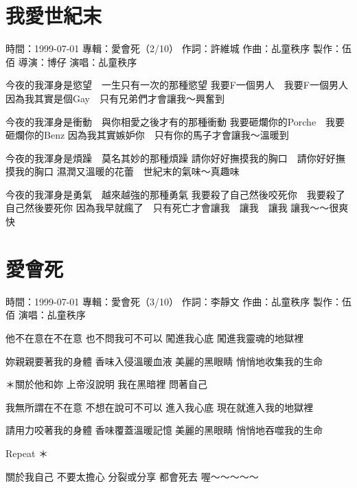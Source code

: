 \documentclass[UTF8,a4paper,oneside,twocolumn,12pt]{ctexbook}
\newcommand{\infopair}[2]{\textbullet #1：#2}
\newcommand{\zc}[1][伍佰]{\infopair{作詞}{#1}}
\newcommand{\zq}[1][伍佰]{\infopair{作曲}{#1}}
\newcommand{\zj}[1]{\infopair{專輯}{#1}}
\newcommand{\zz}[1]{\infopair{製作}{#1}}
\newcommand{\sj}[1]{\infopair{時間}{#1}}
\newenvironment{info}{\begin{flushleft}\kaishu
	}
	{\end{flushleft}\normalsize\yahei\par}
\newenvironment{lyric}{
	}
{}
\begin{document}
\section{我愛世紀末}
\begin{info}
	\sj{1999-07-01}
	\zj{愛會死（2/10）}
	\zc[許維城]
	\zq[乩童秩序]
	\zz{伍佰}
	\infopair{導演}{博仔}
	\infopair{演唱}{乩童秩序}
\end{info}
\begin{lyric}
	今夜的我渾身是慾望　一生只有一次的那種慾望
	我要F一個男人　我要F一個男人
	因為我其實是個Gay　只有兄弟們才會讓我～興奮到

	今夜的我渾身是衝動　與你相愛之後才有的那種衝動
	我要砸爛你的Porche　我要砸爛你的Benz
	因為我其實嫉妒你　只有你的馬子才會讓我～溫暖到

	今夜的我渾身是煩躁　莫名其妙的那種煩躁
	請你好好撫摸我的胸口　請你好好撫摸我的胸口
	濕潤又溫暖的花蕾　世紀末的氣味～真趣味

	今夜的我渾身是勇氣　越來越強的那種勇氣
	我要殺了自己然後咬死你　我要殺了自己然後要死你
	因為我早就瘋了　只有死亡才會讓我　讓我　讓我
	讓我～～很爽快
\end{lyric}

\section{愛會死}
\begin{info}
	\sj{1999-07-01}
	\zj{愛會死（3/10）}
	\zc[李靜文]
	\zq[乩童秩序]
	\zz{伍佰}
	\infopair{演唱}{乩童秩序}
\end{info}
\begin{lyric}
	他不在意在不在意
	也不問我可不可以
	闖進我心底
	闖進我靈魂的地獄裡

	妳親親要著我的身體
	香味入侵溫暖血液
	美麗的黑眼睛
	悄悄地收集我的生命

	＊關於他和妳
	上帝沒說明
	我在黑暗裡
	問著自己

	我無所謂在不在意
	不想在說可不可以
	進入我心底
	現在就進入我的地獄裡

	請用力咬著我的身體
	香味覆蓋溫暖記憶
	美麗的黑眼睛
	悄悄地吞噬我的生命

	Repeat ＊

	關於我自己
	不要太擔心
	分裂或分享
	都會死去
	喔～～～～～
\end{lyric}
\end{document}

